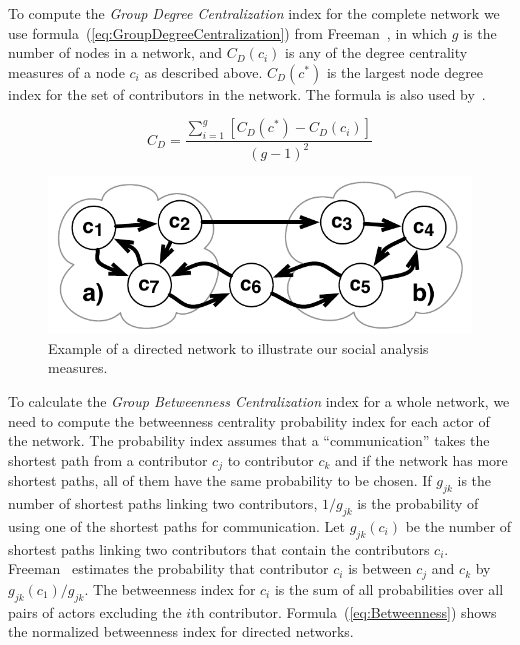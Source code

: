 To compute the \emph{Group Degree Centralization} index for the complete network
we use formula~(\ref{eq:GroupDegreeCentralization}) from
Freeman~\cite{Freeman:1979rl}, in which $g$ is the number of nodes in a network,
and $C_D(c_i)$ is any of the degree centrality measures of a node $c_i$ as
described above. $C_D(c^*)$ is the largest node degree index for the set of
contributors in the network. The formula is also used
by~\cite{Gloor:2003cikm,hinds:cscw:2006}.

\begin{equation}
\displaystyle C_D =  \frac{\sum_{i=1}^g[C_D(c^*) - C_D(c_i)]}{(g-1)^2}
\label{eq:GroupDegreeCentralization}
\end{equation}

\begin{figure}[t]
\begin{center}
\includegraphics[width=.6\columnwidth]{figures/CentralityExample}
\vspace{-10pt}
\caption{Example of a directed network to illustrate our social
analysis measures.}
\label{fig:CentralityExample}
\end{center}
\end{figure}

To calculate the \emph{Group Betweenness Centralization} index for a whole
network, we need to compute the betweenness centrality probability index for each
actor of the network. The probability index assumes that a ``communication''
takes the shortest path from a contributor $c_j$ to contributor $c_k$ and if the
network has more shortest paths, all of them have the same probability to be
chosen. If $g_{jk}$ is the number of shortest paths linking two contributors,
$1/g_{jk}$ is the probability of using one of the shortest paths for
communication. Let $g_{jk}(c_i)$ be the number of shortest paths linking two
contributors that contain the contributors $c_i$. Freeman~\cite{Freeman:1979rl}
estimates the probability that contributor $c_i$ is between $c_j$ and $c_k$ by
$g_{jk}(c_1)/g_{jk}$. The betweenness index for $c_i$ is the sum of all
probabilities over all pairs of actors excluding the $i$th contributor.
Formula~(\ref{eq:Betweenness}) shows the normalized betweenness index for
directed networks.

